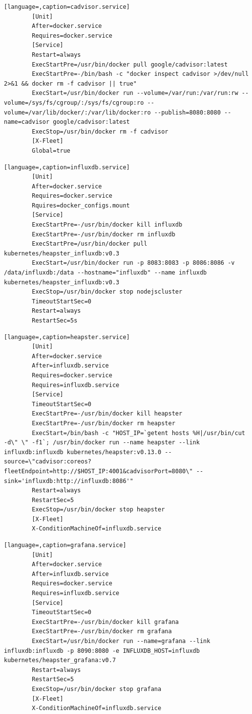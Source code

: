 	\begin{lstlisting}[language=,caption=cadvisor.service]
		[Unit]
		After=docker.service
		Requires=docker.service
		[Service]
		Restart=always
		ExecStartPre=/usr/bin/docker pull google/cadvisor:latest
		ExecStartPre=-/bin/bash -c "docker inspect cadvisor >/dev/null 2>&1 && docker rm -f cadvisor || true"
		ExecStart=/usr/bin/docker run --volume=/var/run:/var/run:rw --volume=/sys/fs/cgroup/:/sys/fs/cgroup:ro --volume=/var/lib/docker/:/var/lib/docker:ro --publish=8080:8080 --name=cadvisor google/cadvisor:latest
		ExecStop=/usr/bin/docker rm -f cadvisor
		[X-Fleet]
		Global=true

	\end{lstlisting}

	\begin{lstlisting}[language=,caption=influxdb.service]
		[Unit]
		After=docker.service
		Requires=docker.service
		Rquires=docker_configs.mount
		[Service]
		ExecStartPre=-/usr/bin/docker kill influxdb
		ExecStartPre=-/usr/bin/docker rm influxdb
		ExecStartPre=/usr/bin/docker pull kubernetes/heapster_influxdb:v0.3
		ExecStart=/usr/bin/docker run -p 8083:8083 -p 8086:8086 -v /data/influxdb:/data --hostname="influxdb" --name influxdb kubernetes/heapster_influxdb:v0.3
		ExecStop=/usr/bin/docker stop nodejscluster
		TimeoutStartSec=0
		Restart=always
		RestartSec=5s

	\end{lstlisting}

	\begin{lstlisting}[language=,caption=heapster.service]
		[Unit]
		After=docker.service
		After=influxdb.service
		Requires=docker.service
		Requires=influxdb.service
		[Service]
		TimeoutStartSec=0
		ExecStartPre=-/usr/bin/docker kill heapster
		ExecStartPre=-/usr/bin/docker rm heapster
		ExecStart=/bin/bash -c "HOST_IP=`getent hosts %H|/usr/bin/cut -d\" \" -f1`; /usr/bin/docker run --name heapster --link influxdb:influxdb kubernetes/heapster:v0.13.0 --source=\"cadvisor:coreos?fleetEndpoint=http://$HOST_IP:4001&cadvisorPort=8080\" --sink='influxdb:http://influxdb:8086'"
		Restart=always
		RestartSec=5
		ExecStop=/usr/bin/docker stop heapster
		[X-Fleet]
		X-ConditionMachineOf=influxdb.service
	\end{lstlisting}

	\begin{lstlisting}[language=,caption=grafana.service]
		[Unit]
		After=docker.service
		After=influxdb.service
		Requires=docker.service
		Requires=influxdb.service
		[Service]
		TimeoutStartSec=0
		ExecStartPre=-/usr/bin/docker kill grafana
		ExecStartPre=-/usr/bin/docker rm grafana
		ExecStart=/usr/bin/docker run --name=grafana --link influxdb:influxdb -p 8090:8080 -e INFLUXDB_HOST=influxdb kubernetes/heapster_grafana:v0.7
		Restart=always
		RestartSec=5
		ExecStop=/usr/bin/docker stop grafana
		[X-Fleet]
		X-ConditionMachineOf=influxdb.service
	\end{lstlisting}	

